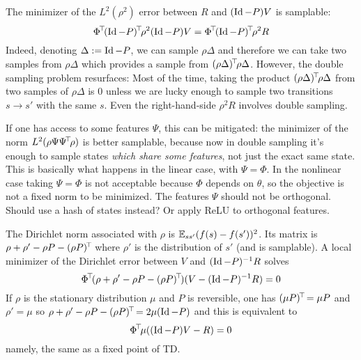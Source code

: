 \documentclass[11pt,a4paper]{article}
\begin{document}
The minimizer of the $L^2(\rho^2)$ error between $R$
and $(\operatorname{Id}-P)V$ is samplable:
\begin{equation}
\transp{\Phi}\transp{(\Id-P)}\rho^2(\Id-P)V=\transp{\Phi}\transp{(\Id-P)}\rho^2
R
\end{equation}
Indeed, denoting $\Delta\mathrel{\mathop{:}}= \operatorname{Id}-P$, we can sample $\rho \Delta$ and
therefore we can take two samples from $\rho \Delta$ which provides a
sample from $(\rho\Delta)^{\!\top}\!\rho\Delta$. However, the double sampling
problem resurfaces: Most of the time, taking the product
$(\rho\Delta)^{\!\top}\!\rho\Delta$ from two samples of $\rho
\Delta$ is $0$ unless we are lucky enough to sample two transitions $s\to
s'$ with the same $s$.
Even the right-hand-side $\rho^2 R$ involves double sampling.

If one has access to some features $\Psi$, this can be mitigated:
the minimizer of the norm $L^2(\rho \Psi\Psi^{\!\top}\!\rho)$ is better
samplable, because now in double sampling it's enough to sample states \emph{which share
some
features}, not just the exact same state. This is basically what happens
in the linear case, with $\Psi=\Phi$. In the nonlinear case taking
$\Psi=\Phi$ is not acceptable because $\Phi$ depends on $\theta$, so the
objective is not a fixed norm to be minimized. The features $\Psi$ should not be orthogonal. Should use a
hash of states instead? Or apply ReLU to orthogonal features.

The Dirichlet norm associated with $\rho$ is $\mathbb{E}_{ss'}
(f(s)-f(s'))^2$. Its matrix is $\rho+\rho'-\rho P-(\rho P)^{\!\top}\!$ where
$\rho'$ is the distribution of $s'$ (and is samplable).
A local minimizer of the Dirichlet error between $V$ and
$(\operatorname{Id}-P)^{-1}R$ solves
\begin{equation}
\Phi^{\!\top}\! (\rho+\rho'-\rho P-(\rho P)^{\!\top}\!)(V-(\operatorname{Id}-P)^{-1}R)=0
\end{equation}
If $\rho$ is the stationary distribution $\mu$ and $P$ is reversible, one
has $(\mu P)^{\!\top}\!=\mu P$ and $\rho'=\mu$ so $\rho+\rho'-\rho P-(\rho
P)^{\!\top}\!=2\mu(\operatorname{Id}-P)$ and this is equivalent to
\begin{equation}
\Phi^{\!\top}\!\mu ((\operatorname{Id}-P)V-R)=0
\end{equation}
namely, the same as a fixed point of TD.
\end{document}
